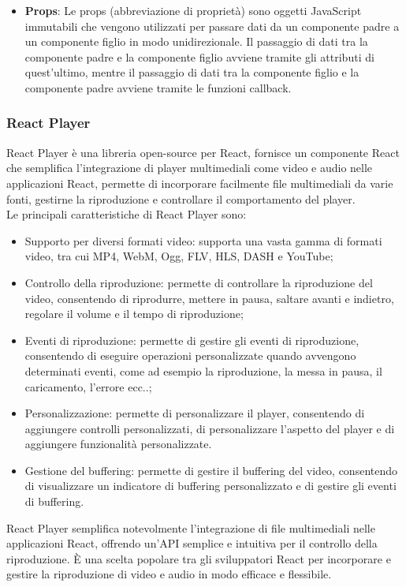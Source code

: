 \begin{itemize}
\item \textbf{Props}:
Le props (abbreviazione di proprietà) sono oggetti JavaScript immutabili che vengono utilizzati per passare dati da un componente padre a un componente figlio in modo unidirezionale.
Il passaggio di dati tra la componente padre e la componente figlio avviene tramite gli attributi di quest'ultimo, mentre il passaggio di dati tra la componente figlio e la componente padre avviene tramite le funzioni callback.\\
    \end{itemize}
\subsubsection{React Player}
React Player è una libreria open-source per React, fornisce un componente React che semplifica l'integrazione di player multimediali come video e audio nelle applicazioni React, permette di incorporare facilmente file multimediali da varie fonti, gestirne la riproduzione e controllare il comportamento del player.\\
Le principali caratteristiche di React Player sono:
\begin{itemize}
    \item{Supporto per diversi formati video}: supporta una vasta gamma di formati video, tra cui MP4, WebM, Ogg, FLV, HLS, DASH e YouTube;
    \item{Controllo della riproduzione}: permette di controllare la riproduzione del video, consentendo di riprodurre, mettere in pausa, saltare avanti e indietro, regolare il volume e il tempo di riproduzione;
    \item{Eventi di riproduzione}: permette di gestire gli eventi di riproduzione, consentendo di eseguire operazioni personalizzate quando avvengono determinati eventi, come ad esempio la riproduzione, la messa in pausa, il caricamento, l'errore ecc..;
    \item{Personalizzazione}: permette di personalizzare il player, consentendo di aggiungere controlli personalizzati, di personalizzare l'aspetto del player e di aggiungere funzionalità personalizzate.
    \item{Gestione del buffering}: permette di gestire il buffering del video, consentendo di visualizzare un indicatore di buffering personalizzato e di gestire gli eventi di buffering.
\end{itemize}
React Player semplifica notevolmente l'integrazione di file multimediali nelle applicazioni React, offrendo un'API semplice e intuitiva per il controllo della riproduzione. È una scelta popolare tra gli sviluppatori React per incorporare e gestire la riproduzione di video e audio in modo efficace e flessibile.\\
